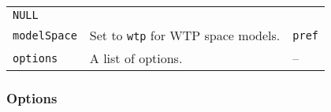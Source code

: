 \documentclass[article]{jss}
\begin{document}
\begin{longtable}[]{@{}lll@{}}
\begin{minipage}[t]{0.11\columnwidth}
\texttt{NULL}\strut
\end{minipage}\tabularnewline
\begin{minipage}[t]{0.14\columnwidth}\raggedright
\texttt{modelSpace}\strut
\end{minipage} & \begin{minipage}[t]{0.66\columnwidth}\raggedright
Set to \texttt{\textquotesingle{}wtp\textquotesingle{}} for WTP space
models.\strut
\end{minipage} & \begin{minipage}[t]{0.11\columnwidth}\raggedright
\texttt{\textquotesingle{}pref\textquotesingle{}}\strut
\end{minipage}\tabularnewline
\begin{minipage}[t]{0.14\columnwidth}\raggedright
\texttt{options}\strut
\end{minipage} & \begin{minipage}[t]{0.66\columnwidth}\raggedright
A list of options.\strut
\end{minipage} & \begin{minipage}[t]{0.11\columnwidth}\raggedright
--\strut
\end{minipage}\tabularnewline
\bottomrule
\end{longtable}

\hypertarget{options}{%
\subsubsection{Options}\label{options}}
\end{document}
